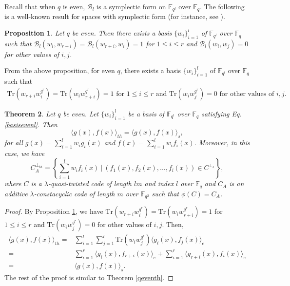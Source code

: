 \documentclass[12 pt]{extarticle}
\numberwithin{equation}{section}
\newtheorem{theorem}{Theorem}[section]
\newtheorem{proposition}[theorem]{Proposition}
\theoremstyle{definition}
\begin{document}
Recall that when $q$ is even, $\mathcal{B}_l$ is a symplectic form on $\mathbb{F}_{q^l}$ over $\mathbb{F}_q$. The following is a well-known result for spaces with symplectic form (for instance, see  \cite[19.16, p. 81]{Aschbacher2000}).
\begin{proposition}\label{basisleven}
Let $q$ be even. Then there exists a basis  $\{w_i\}_{i=1}^l$ of $\mathbb{F}_{q^l}$ over $\mathbb{F}_q$ such that $\mathcal{B}_l(w_i,w_{r+i})=\mathcal{B}_l(w_{r+i},w_i)=1$ for $1\leq i\leq r$ and $\mathcal{B}_l(w_i,w_j)=0$ for other values of $i,j$.      
\end{proposition}

From the above proposition, for even $q$, there exists a basis  $\{w_i\}_{i=1}^l$  of $\mathbb{F}_{q^l}$ over $\mathbb{F}_q$ such that 
\begin{equation}\label{basisevenl}
 \begin{split}
     \text{Tr}(w_{r+i}w_i^{q^r})=\text{Tr}(w_iw_{r+i}^{q^r})=1 \text{ for } 1\leq i\leq r \text{ and } \text{Tr}(w_iw_j^{q^r})=0 \text{ for other values of } i,j.  
 \end{split}   
\end{equation}



\begin{theorem}
    Let $q$ be even. Let  $\{w_i\}_{i=1}^l$ be a basis of $\mathbb{F}_{q^l}$ over $\mathbb{F}_q$ satisfying Eq. \ref{basisevenl}. Then 
 $$\langle g(x),f(x)\rangle_{th} =\langle g(x),f(x)\rangle_s,$$ for all $g(x)=\sum_{i=1}^lw_ig_i(x)$ and $f(x)=\sum_{i=1}^lw_if_i(x)$.  Moreover, in this case, we have  $$C_A^{\perp_{th}}=\left \{\sum_{i=1}^lw_if_i(x)\ |\  (f_1(x),f_2(x),\dots,f_l(x))\in C^{\perp_s}\right \},$$
where $C$ is a $\lambda$-quasi-twisted code of length $lm$ and index $l$ over $\mathbb{F}_q$ and $C_A$ is an additive $\lambda$-constacyclic code of length $m$ over $\mathbb{F}_{q^2}$ such that  $\phi(C)=C_A$.
\end{theorem}
\begin{proof}
By Proposition \ref{basisleven}, we have $\text{Tr}(w_{r+i}w_i^{q^r})=\text{Tr}(w_iw_{r+i}^{q^r})=1$ for $1\leq i\leq r$ and $\text{Tr}(w_iw_j^{q^r})=0$ for other values of $i,j$. Then,
\begin{equation*}
    \begin{split}
      \langle g(x),f(x)\rangle_{th}=&\sum_{i=1}^l\sum_{j=1}^l \text{Tr}(w_iw_j^{q^r})\langle g_i(x),f_j(x)\rangle_e\\
      =&\sum_{i=1}^r\langle g_i(x),f_{r+i}(x)\rangle_e+\sum_{i=1}^r\langle g_{r+i}(x),f_i(x)\rangle_e \\
      =&\langle g(x),f(x)\rangle_s.
    \end{split}
\end{equation*}
The rest of the proof is similar to Theorem \ref{qeventh}.
\end{proof}
\end{document}
